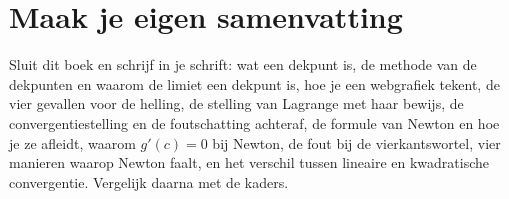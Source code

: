
\begin{oefeningen}


\end{oefeningen}


\begin{oefeningen}






\end{oefeningen}


\ifzelfstudie
\section*{Maak je eigen samenvatting}
Sluit dit boek en schrijf in je schrift: wat een dekpunt is, de methode van de dekpunten en waarom de limiet een dekpunt is, hoe je een webgrafiek tekent, de vier gevallen voor de helling, de stelling van Lagrange met haar bewijs, de convergentiestelling en de foutschatting achteraf, de formule van Newton en hoe je ze afleidt, waarom $g'(c) = 0$ bij Newton, de fout bij de vierkantswortel, vier manieren waarop Newton faalt, en het verschil tussen lineaire en kwadratische convergentie. Vergelijk daarna met de kaders.
\fi

